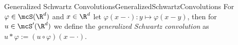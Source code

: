 \begin{mdef}{Generalized Schwartz Convolutions}{GeneralizedSchwartzConvolutions}
    For $\varphi\in\mcS(\R^d)$ and $x\in\R^d$ let $\varphi(x - \cdot):y\mapsto \varphi(x - y)$, then for $u\in\mcS'(\R^d)$ we define the \emph{generalized Schwartz convolution} as $u\ast\varphi:=(u\circ\varphi)(x - \cdot)$.
\end{mdef}